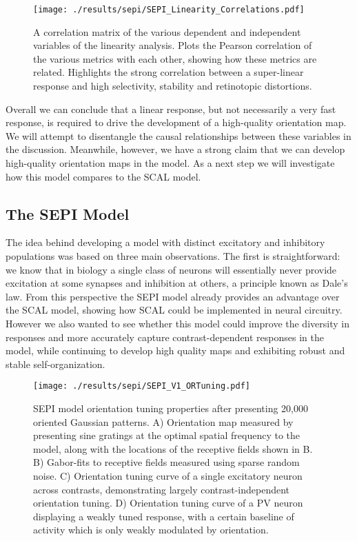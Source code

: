 \begin{figure}
	\centering
    \texttt{[image: ./results/sepi/SEPI\_Linearity\_Correlations.pdf]}
	\caption{A correlation matrix of the various dependent and
      independent variables of the linearity analysis. Plots the
      Pearson correlation of the various metrics with each other,
      showing how these metrics are related. Highlights the strong
      correlation between a super-linear response and high
      selectivity, stability and retinotopic distortions.}
	\label{SEPILinearityCorr}
\end{figure}

Overall we can conclude that a linear response, but not necessarily a
very fast response, is required to drive the development of a
high-quality orientation map. We will attempt to disentangle the
causal relationships between these variables in the
discussion. Meanwhile, however, we have a strong claim that we can develop
high-quality orientation maps in the model. As a next step we will
investigate how this model compares to the SCAL model.

\subsection{The SEPI Model}

The idea behind developing a model with distinct excitatory and
inhibitory populations was based on three main observations. The first
is straightforward: we know that in biology a single class of neurons
will essentially never provide excitation at some synapses and
inhibition at others, a principle known as Dale's law. From this
perspective the SEPI model already provides an advantage over the SCAL
model, showing how SCAL could be implemented in neural
circuitry. However we also wanted to see whether this model could
improve the diversity in responses and more accurately capture
contrast-dependent responses in the model, while continuing to develop
high quality maps and exhibiting robust and stable self-organization.

\begin{figure}
	\centering
    \texttt{[image: ./results/sepi/SEPI\_V1\_ORTuning.pdf]}
	\caption{SEPI model orientation tuning properties after presenting
      20,000 oriented Gaussian patterns. A) Orientation map measured
      by presenting sine gratings at the optimal spatial frequency to
      the model, along with the locations of the receptive fields
      shown in B. B) Gabor-fits to receptive fields measured using
      sparse random noise. C) Orientation tuning curve of a single
      excitatory neuron across contrasts, demonstrating largely
      contrast-independent orientation tuning. D) Orientation tuning
      curve of a PV neuron displaying a weakly tuned response, with a
      certain baseline of activity which is only weakly modulated by
      orientation.}
	\label{SEPIORTuning}
\end{figure}

